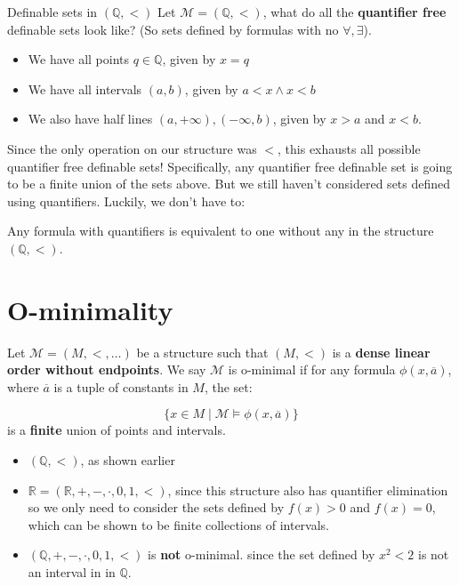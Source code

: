 \documentclass{beamer}
\begin{document}
\begin{frame}{Definable sets in $(\mathbb{Q}, <)$}
    Let $\mathcal{M} = (\mathbb{Q}, <)$, what do all the \textbf{quantifier free} definable sets look like? (So sets defined by formulas with no $\forall, \exists$).
    
    \begin{itemize}
        \item We have all points $q \in \mathbb{Q}$, given by $x = q$
        \item We have all intervals $(a,b)$, given by $a < x \land x < b$
        \item We also have half lines $(a, +\infty), (-\infty, b)$, given by $x > a$ and $x < b$.
    \end{itemize}
    
    Since the only operation on our structure was $<$, this exhausts all possible quantifier free definable sets! Specifically, any quantifier free definable set is going to be a finite union of the sets above. But we still haven't considered sets defined using quantifiers. Luckily, we don't have to:
    
    \begin{theorem}
        Any formula with quantifiers is equivalent to one without any in the structure $(\mathbb{Q}, <)$.
    \end{theorem}
\end{frame}

\section{O-minimality}

\begin{frame}
    \begin{definition}
        Let $\mathcal{M} = (M, < ,\ldots)$ be a structure such that $(M, <)$ is a \textbf{dense linear order without endpoints}. We say $\mathcal{M}$ is o-minimal if for any formula $\phi(x, \overline{a})$, where $\overline{a}$ is a tuple of constants in $M$, the set:
        
        $$ \{x \in M \mid \mathcal{M} \models \phi(x, \overline{a}) \}$$ is a \textbf{finite} union of points and intervals.
    \end{definition}

   \begin{example}
        \begin{itemize}
            \item $(\mathbb{Q}, <)$, as shown earlier
            \item $\mathbb{R} = (\mathbb{R}, +, - ,\cdot, 0, 1, <)$, since this structure also has quantifier elimination so we only need to consider the sets defined by $f(x) > 0$ and $f(x) = 0$, which can be shown to be finite collections of intervals.
            \item $(\mathbb{Q}, +, - ,\cdot, 0, 1, <)$ is \textbf{not} o-minimal. since the set defined by $x^2 < 2$ is not an interval in in $\mathbb{Q}$.
        \end{itemize}
    \end{example}
\end{frame}
\end{document}
